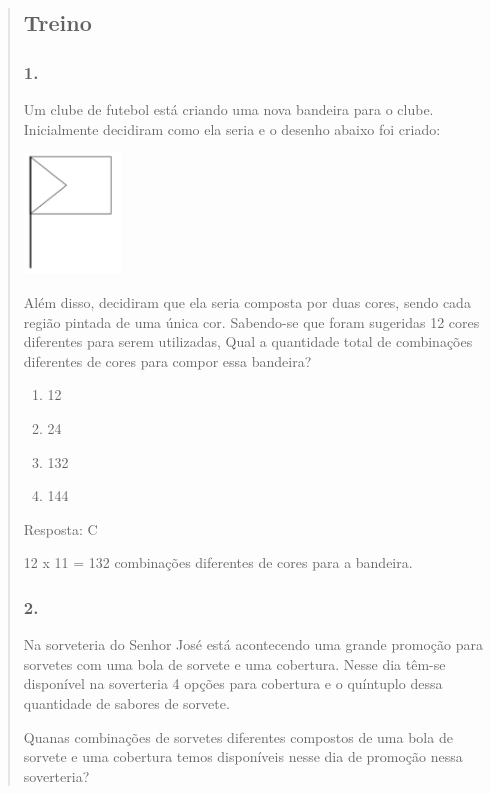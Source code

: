 \begin{enumerate}
\begin{escolha}
\begin{enumerate}
\begin{itemize}
\begin{itemize}
\begin{escolha}
\begin{quote}
\begin{escolha}
{\subsection{Treino}\label{treino-10}

\subsubsection{1.}\label{section-140}

Um clube de futebol está criando uma nova bandeira para o clube.
Inicialmente decidiram como ela seria e o desenho abaixo foi criado:

\includegraphics[width=1.02511in,height=1.26282in]{media/image140.png}

Além disso, decidiram que ela seria composta por duas cores, sendo cada
região pintada de uma única cor. Sabendo-se que foram sugeridas 12 cores
diferentes para serem utilizadas, Qual a quantidade total de combinações
diferentes de cores para compor essa bandeira?

\begin{enumerate}
\def\labelenumi{\alph{enumi})}
\item
  12
\item
  24
\item
  132
\item
  144
\end{enumerate}

Resposta: C

12 x 11 = 132 combinações diferentes de cores para a bandeira.

\subsubsection{2.}\label{section-141}

Na sorveteria do Senhor José está acontecendo uma grande promoção para
sorvetes com uma bola de sorvete e uma cobertura. Nesse dia têm-se
disponível na soverteria 4 opções para cobertura e o quíntuplo dessa
quantidade de sabores de sorvete.

Quanas combinações de sorvetes diferentes compostos de uma bola de
sorvete e uma cobertura temos disponíveis nesse dia de promoção nessa
soverteria?

}
\end{escolha}
\end{quote}
\end{escolha}
\end{itemize}
\end{itemize}
\end{enumerate}
\end{escolha}
\end{enumerate}
